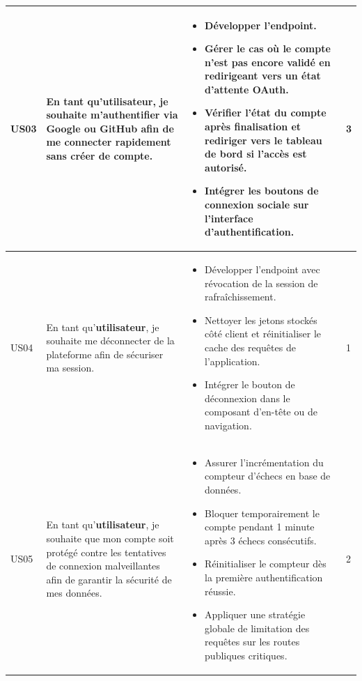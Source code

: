 \begin{longtable}{|C{1cm}|L{5.6cm}|L{8cm}|C{0.85cm}|}
US03 & En tant qu'\textbf{utilisateur}, je souhaite m'authentifier via Google ou GitHub afin de me connecter rapidement sans créer de compte. &
\begin{itemize}[nosep, left=0pt, label={$\bullet$}]
\item Développer l'endpoint.
\item Gérer le cas où le compte n'est pas encore validé en redirigeant vers un état d'attente OAuth.
\item Vérifier l'état du compte après finalisation et rediriger vers le tableau de bord si l'accès est autorisé.
\item Intégrer les boutons de connexion sociale sur l'interface d'authentification.
\end{itemize} & 3 \\
\hline

US04 & En tant qu'\textbf{utilisateur}, je souhaite me déconnecter de la plateforme afin de sécuriser ma session. &
\begin{itemize}[nosep, left=0pt, label={$\bullet$}]
\item Développer l'endpoint avec révocation de la session de rafraîchissement.
\item Nettoyer les jetons stockés côté client et réinitialiser le cache des requêtes de l'application.
\item Intégrer le bouton de déconnexion dans le composant d'en-tête ou de navigation.
\end{itemize} & 1 \\
\hline

US05 & En tant qu'\textbf{utilisateur}, je souhaite que mon compte soit protégé contre les tentatives de connexion malveillantes afin de garantir la sécurité de mes données. &
\begin{itemize}[nosep, left=0pt, label={$\bullet$}]
\item Assurer l'incrémentation du compteur d'échecs en base de données.
\item Bloquer temporairement le compte pendant 1 minute après 3 échecs consécutifs.
\item Réinitialiser le compteur dès la première authentification réussie.
\item Appliquer une stratégie globale de limitation des requêtes sur les routes publiques critiques.
\end{itemize} & 2 \\
\hline


\end{longtable}
